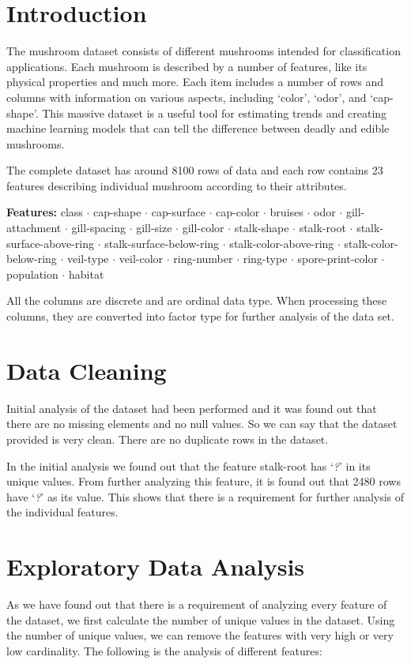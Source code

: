 \documentclass{article}
\begin{document}
\section{Introduction}\label{sec:intro}
The mushroom dataset consists of different mushrooms intended for classification applications. Each mushroom is described by a number of features, like its physical properties and much more. Each item includes a number of rows and columns with information on various aspects, including `color', `odor', and `cap-shape'. This massive dataset is a useful tool for estimating trends and creating machine learning models that can tell the difference between deadly and edible mushrooms.

The complete dataset has around 8100 rows of data and each row contains 23 features describing individual mushroom according to their attributes.

\textbf{Features:} class $\cdot$ cap-shape $\cdot$ cap-surface $\cdot$ cap-color $\cdot$ bruises $\cdot$ odor $\cdot$ gill-attachment $\cdot$ gill-spacing $\cdot$ gill-size $\cdot$ gill-color $\cdot$ stalk-shape $\cdot$ stalk-root $\cdot$ stalk-surface-above-ring $\cdot$ stalk-surface-below-ring $\cdot$ stalk-color-above-ring $\cdot$ stalk-color-below-ring $\cdot$ veil-type $\cdot$ veil-color $\cdot$ ring-number $\cdot$ ring-type $\cdot$ spore-print-color $\cdot$ population $\cdot$ habitat

All the columns are discrete and are ordinal data type. When processing these columns, they are converted into factor type for further analysis of the data set.


\section{Data Cleaning}\label{sec:dc}
Initial analysis of the dataset had been performed and it was found out that there are no missing elements and no null values. So we can say that the dataset provided is very clean. There are no duplicate rows in the dataset.

In the initial analysis we found out that the feature stalk-root has `\textit{?}' in its unique values. From further analyzing this feature, it is found out that 2480 rows have `\textit{?}' as its value. This shows that there is a requirement for further analysis of the individual features.

\section{Exploratory Data Analysis}\label{sec:eda}
As we have found out that there is a requirement of analyzing every feature of the dataset, we first calculate the number of unique values in the dataset. Using the number of unique values, we can remove the features with very high or very low cardinality. The following is the analysis of different features:
\end{document}
